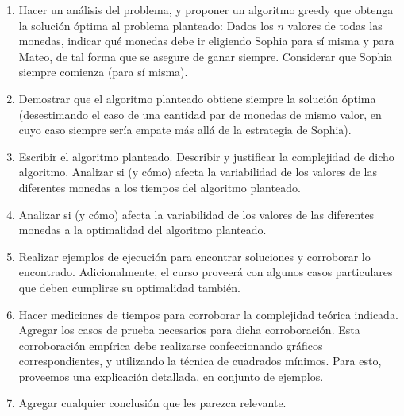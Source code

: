 \begin{enumerate}
    \item Hacer un análisis del problema, y proponer un algoritmo greedy que obtenga la solución óptima al problema planteado: Dados los $n$ valores de todas las monedas, indicar qué monedas debe ir eligiendo Sophia para sí misma y para Mateo, de tal forma que se asegure de ganar siempre. Considerar que Sophia siempre comienza (para sí misma).
    \vskip0.3cm
    \item Demostrar que el algoritmo planteado obtiene siempre la solución óptima (desestimando el caso de una cantidad par de monedas de mismo valor, en cuyo caso siempre sería empate más allá de la estrategia de Sophia).
    \vskip0.3cm
    \item Escribir el algoritmo planteado. Describir y justificar la complejidad de dicho algoritmo. Analizar si (y cómo) afecta la variabilidad de los valores de las diferentes monedas a los tiempos del algoritmo planteado.
    \vskip0.3cm
    \item Analizar si (y cómo) afecta la variabilidad de los valores de las diferentes monedas a la optimalidad del algoritmo planteado.
    \vskip0.3cm
    \item Realizar ejemplos de ejecución para encontrar soluciones y corroborar lo encontrado. Adicionalmente, el curso proveerá con algunos casos particulares que deben cumplirse su optimalidad también.
    \vskip0.3cm
    \item Hacer mediciones de tiempos para corroborar la complejidad teórica indicada. Agregar los casos de prueba necesarios para dicha corroboración. Esta corroboración empírica debe realizarse confeccionando gráficos correspondientes, y utilizando la técnica de cuadrados mínimos. Para esto, proveemos una explicación detallada, en conjunto de ejemplos.
    \vskip0.3cm
    \item Agregar cualquier conclusión que les parezca relevante.
\end{enumerate}


